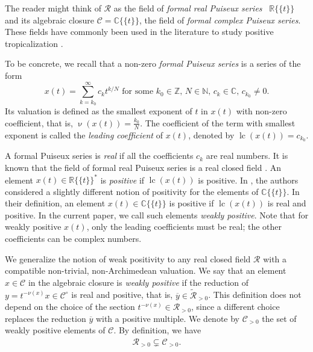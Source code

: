 \documentclass{article}
\theoremstyle{definition}
\DeclareMathOperator{\val}{\nu}
\DeclareMathOperator{\lc}{lc}
\newcommand{\RR}{\mathcal{R}}
\newcommand{\CC}{\mathcal{C}}
\begin{document}
The reader might think of $\mathcal{R}$ as the field of \emph{formal real Puiseux series} ~$\mathbb{R}\{\!\{t \}\!\}$ and its algebraic closure $\mathcal{C} = \mathbb{C}\{\!\{t \}\!\}$, the field of \emph{formal complex Puiseux series}. These fields have commonly been used in the literature to study positive tropicalization \cite{SpeyerWilliams::PosGrassmannian,Tabera::Bases,Brandenburg::TropicalPositivity}. 

To be concrete, we recall that a non-zero \emph{formal Puiseux series} is a series of the form
\[ x(t)=\sum_{k=k_0}^{\infty} c_k t^{k / N} \text { for some } k_0 \in \mathbb{Z},\, N \in \mathbb{N},\, c_k \in \mathbb{C}, \, c_{k_0} \neq 0. \]
Its valuation is defined as the smallest exponent of $t$ in $x(t)$ with non-zero coefficient, that is, $\val(x(t)) = \tfrac{k_0}{N}$. The coefficient of the term with smallest exponent is called the \emph{leading coefficient} of $x(t)$, denoted by $\lc (x(t)) = c_{k_0}$.

A formal Puiseux series is \emph{real} if all the coefficients $c_k$ are real numbers. It is known that the field of formal real Puiseux series is a real closed field \cite[Theorem 2.91]{basu2007algorithms}. An element $x(t) \in \mathbb{R}\{\!\{t \}\!\}^*$ is \emph{positive} if $\lc(x(t))$ is positive. In \cite{SpeyerWilliams::PosGrassmannian}, the authors considered a slightly different notion of positivity for the elements of $\mathbb{C}\{\!\{t \}\!\}$. In their definition, an element $x(t) \in \mathbb{C}\{\!\{t \}\!\}$ is positive if $\lc(x(t))$ is real and positive. In the current paper, we call such elements \emph{weakly positive}. Note that for weakly positive $x(t)$, only the leading coefficients must be real; the other coefficients can be complex numbers.

We generalize the notion of weak positivity to any real closed field $\RR$ with a compatible non-trivial, non-Archimedean valuation. We say that an element $x \in \CC$ in the algebraic closure is \emph{weakly positive} if the reduction of $y = t^{-\nu(x)}x \in \CC^\circ$ is real and positive, that is, $\overline{y} \in \widetilde{\RR}_{>0}$.
This definition does not depend on the choice of the section $t^{-\nu(x)} \in \RR_{>0}$, since a different choice replaces the reduction $\overline{y}$ with a positive multiple.
We denote by $\CC_{>0}$ the set of weakly positive elements of $\CC$. By definition, we have
\begin{align}
\label{Eq:DiffPosIncl}
\RR_{>0} \subsetneq \CC_{>0}.
\end{align}
\end{document}
